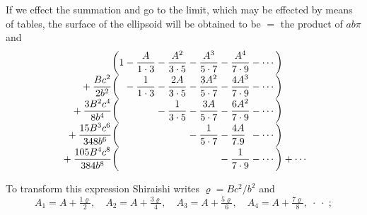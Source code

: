 \documentclass[11pt]{article}
\begin{document}
If we effect the summation and go to the limit, which may be effected by means of tables, the surface of the ellipsoid will be obtained to be $=$ the product of $ab\pi$ and
\[
\begin{array}{r@{}l@{}l@{}l@{}l@{}l@{}l}
\biggl( & 1 & {}-\dfrac{A}{1\cdot 3} & {}-\dfrac{A^2}{3\cdot 5} & {}-\dfrac{A^3}{5\cdot 7} & {}-\dfrac{A^4}{7\cdot 9} & {}-\cdots\biggr)\\[2mm]
{}+\dfrac{Bc^2}{2b^2}\biggl( & & {}-\dfrac{1}{1\cdot 3} & {}-\dfrac{2A}{3\cdot 5} & {}-\dfrac{3A^2}{5\cdot 7} & {}-\dfrac{4A^3}{7\cdot 9} & {}-\cdots\biggr)\\[2mm]
{}+\dfrac{3B^2c^4}{8b^4}\biggl( & & & {}-\dfrac{1}{3\cdot 5} & {}-\dfrac{3A}{5\cdot 7} & {}-\dfrac{6A^2}{7\cdot 9} & {}-\cdots\biggr)\\[2mm]
{}+\dfrac{15B^3c^6}{348b^6}\biggl( & & & & {}-\dfrac{1}{5\cdot 7} & {}-\dfrac{4A}{7.9} & {}-\cdots\biggr)\\[2mm]
{}+\dfrac{105B^4c^8}{384b^8}\biggl( & & & & & {}-\dfrac{1}{7\cdot 9} & {}-\cdots\biggr)+\cdots
\end{array}
\]

To transform this expression Shiraishi writes $\varrho=Bc^2/b^2$ and
\[
A_1=A+\tfrac{1\varrho}{2},\quad A_2=A+\tfrac{3\varrho}{4},\quad A_3=A+\tfrac{5\varrho}{6},\quad A_4=A+\tfrac{7\varrho}{8},\;\cdot\;\cdot\;;
\]
\end{document}
